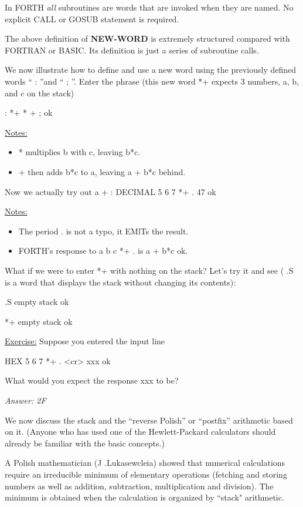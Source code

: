 In FORTH \textit{all} subroutines are words that are invoked when they are named. No explicit CALL or GOSUB statement is required.

The above deﬁnition of \textbf{NEW-WORD} is extremely structured compared with FORTRAN or BASIC. Its deﬁnition is just a series of subroutine calls.

We now illustrate how to deﬁne and use a new word using the previously deﬁned words “ : ”and “ ; ”. Enter the phrase (this new word *+ expects 3 numbers, a, b, and c on the stack)

: *+ 	* + ; ok

\underline{Notes:}
\begin{itemize}
	\item * multiplies b with c, leaving b*c.
	\item + then adds b*c to a, leaving a + b*c behind.
\end{itemize}

Now we actually try out a + :
DECIMAL 5 6 7 *+ . 47 ok

\underline{Notes:}
\begin{itemize}
	\item The period . is not a typo, it EMlTs the result.
	\item FORTH’s response to a b c *+ . is a + b*c ok.
\end{itemize}

What if we were to enter *+ with nothing on the stack? Let's try it and see ( .S is a word that displays the stack without changing its contents):

.S empty stack ok

*+ empty stack ok

\underline{Exercise:}
Suppose you entered the input line

HEX 5 6 7 *+ . <cr> xxx ok

What would you expect the response xxx to be?

\textit{Answer: 2F}


We now discuss the stack and the “reverse Polish” or “postﬁx” arithmetic based on it. (Anyone who has used one of the Hewlett-Packard calculators should already be familiar with the basic concepts.)

A Polish mathematician (J .Lukasewcleia) showed that numerical calculations require an irreducible minimum of elementary operations (fetching and storing numbers as well as addition, subtraction, multiplication and division). The minimum is obtained when the calculation is organized by “stack" arithmetic.

